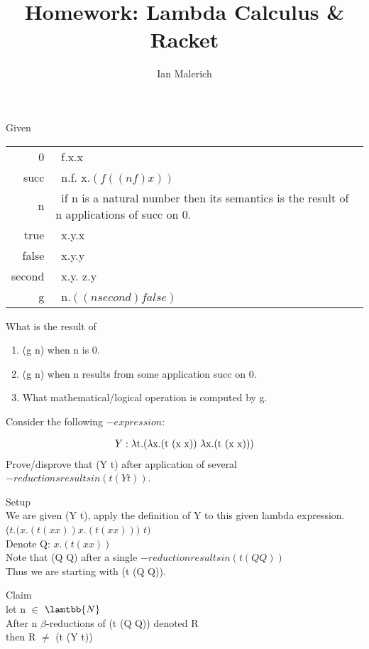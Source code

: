 \documentclass{jhwhw}
\author{Ian Malerich}
\title{Homework: Lambda Calculus \& Racket}
\begin{document}
\problem{}

Given

\begin{tabular}{r@{:}l}
	0&\ \lambda f.\lambda x.x \\
	succ&\ \lambda n.\lambda f. \lambda x.$(f ((n f) x))$ \\
	n&\ if n is a natural number then its semantics is the result of n applications of succ on 0. \\
	true&\ \lambda x.\lambda y.x \\
	false&\ \lambda x.\lambda y.y \\
	second&\ \lambda x.\lambda y. \lambda z.y \\
	g&\ \lambda n.$((n second) false)$ \\
\end{tabular}
\bigbreak
\raggedright
What is the result of

\begin{enumerate}
	\item (g n) when n is 0.
	\item (g n) when n results from some application succ on 0.
	\item What mathematical/logical operation is computed by g.
\end{enumerate}

\solution

\problem{}

Consider the following \lambda$-expression$:

\begin{gather*}
Y : \lambda$t.($\lambda$x.(t (x x)) $\lambda$x.(t (x x)))$
\end{gather*}
Prove/disprove that (Y t) after application of several \beta$-reductions results in (t (Y t))$.

\solution

Setup \\
	\setlength\parindent{24pt}
	We are given (Y t), apply the definition of Y to this given lambda expression. \\
	(\lambda$t.($\lambda$x.(t (x x)) $\lambda$x.(t (x x)))$ $ t)$ \\
	Denote Q: \lambda $x.(t (x x))$ \\
	Note that (Q Q) after a single \beta$-reduction results in (t (Q Q))$ \\
	Thus we are starting with (t (Q Q)).

	\bigbreak
	\setlength\parindent{0pt}
	Claim \\
		\setlength\parindent{24pt}
		let n $\in$ $\lamtbb{N}$ \\
		After n $\beta$-reductions of (t (Q Q)) denoted R \\
		then R $\neq$ (t (Y t)) \\
	 
\end{document}
